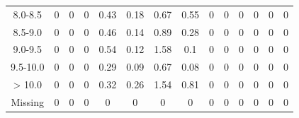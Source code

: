 \documentclass[12pt]{dforeport}
\begin{document}
\begin{landscape}
\begin{table}[ht]
\begin{tabular}{c | c c c c c | c c c c c c c c}
8.0-8.5 & 0 & 0 & 0 & 0.43 & 0.18 & 0.67 & 0.55 & 0 & 0 & 0 & 0 & 0 & 0 \\
8.5-9.0 & 0 & 0 & 0 & 0.46 & 0.14 & 0.89 & 0.28 & 0 & 0 & 0 & 0 & 0 & 0 \\
9.0-9.5 & 0 & 0 & 0 & 0.54 & 0.12 & 1.58 & 0.1 & 0 & 0 & 0 & 0 & 0 & 0 \\
9.5-10.0 & 0 & 0 & 0 & 0.29 & 0.09 & 0.67 & 0.08 & 0 & 0 & 0 & 0 & 0 & 0 \\
> 10.0 & 0 & 0 & 0 & 0.32 & 0.26 & 1.54 & 0.81 & 0 & 0 & 0 & 0 & 0 & 0 \\
Missing & 0 & 0 & 0 & 0 & 0 & 0 & 0 & 0 & 0 & 0 & 0 & 0 & 0 \\
\bottomrule
\end{tabular}
\end{table}


\end{landscape}
\end{document}
